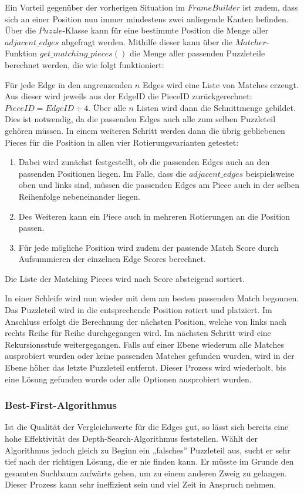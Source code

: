 Ein Vorteil gegenüber der vorherigen Situation im $FrameBuilder$ ist zudem, dass sich an einer Position nun immer mindestens zwei anliegende Kanten befinden. Über die $Puzzle$-Klasse kann für eine bestimmte Position die Menge aller $adjacent\_edges$ abgefragt werden. Mithilfe dieser kann über die $Matcher$-Funktion $get\_matching\_pieces()$ die Menge aller passenden Puzzleteile berechnet werden, die wie folgt funktioniert:

Für jede Edge in den angrenzenden $n$ Edges wird eine Liste von Matches erzeugt. Aus dieser wird jeweils aus der EdgeID die PieceID zurückgerechnet: $PieceID = EdgeID \div 4$. Über alle $n$ Listen wird dann die Schnittmenge gebildet. 
Dies ist notwendig, da die passenden Edges auch alle zum selben Puzzleteil gehören müssen. In einem weiteren Schritt werden dann die übrig gebliebenen Pieces für die Position in allen vier Rotierungsvarianten getestet: 
\begin{enumerate}
    \item Dabei wird zunächst festgestellt, ob die passenden Edges auch an den passenden Positionen liegen. Im Falle, dass die $adjacent\_edges$ beispielsweise oben und links sind, müssen die passenden Edges am Piece auch in der selben Reihenfolge nebeneinander liegen.
    \item Des Weiteren kann ein Piece auch in mehreren Rotierungen an die Position passen.
    \item Für jede mögliche Position wird zudem der passende Match Score durch Aufsummieren der einzelnen Edge Scores berechnet.
\end{enumerate}
 Die Liste der Matching Pieces wird nach Score absteigend sortiert.

In einer Schleife wird nun wieder mit dem am besten passenden Match begonnen. Das Puzzleteil wird in die entsprechende Position rotiert und platziert. Im Anschluss erfolgt die Berechnung der nächsten Position, welche von links nach rechts Reihe für Reihe durchgegangen wird. Im nächsten Schritt wird eine Rekursionsstufe weitergegangen. Falls auf einer Ebene wiederum alle Matches ausprobiert wurden oder keine passenden Matches gefunden wurden, wird in der Ebene höher das letzte Puzzleteil entfernt.
Dieser Prozess wird wiederholt, bis eine Lösung gefunden wurde oder alle Optionen ausprobiert wurden.

\subsubsection[Best-First-Algorithmus]{Best-First-Algorithmus }
Ist die Qualität der Vergleichswerte für die Edges gut, so lässt sich bereits eine hohe Effektivität des Depth-Search-Algorithmus feststellen. 
Wählt der Algorithmus jedoch gleich zu Beginn ein „falsches” Puzzleteil aus, sucht er sehr tief nach der richtigen Lösung, die er nie finden kann. Er müsste im Grunde den gesamten Suchbaum aufwärts gehen, um zu einem anderen Zweig zu gelangen. Dieser Prozess kann sehr ineffizient sein und viel Zeit in Anspruch nehmen.


